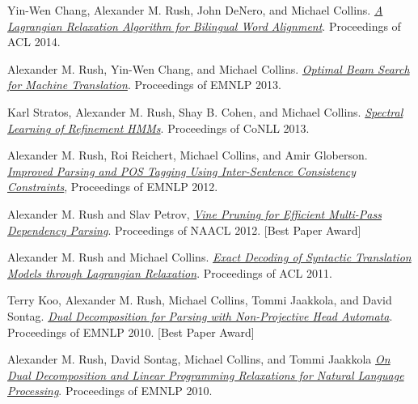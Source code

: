\documentclass[11pt]{article}
\begin{document}
{%


\ind Yin-Wen Chang, Alexander M. Rush, John DeNero, and Michael Collins. 
\emph{\href{http://people.csail.mit.edu/srush/}{A Lagrangian Relaxation Algorithm for Bilingual Word Alignment}}.
Proceedings of ACL 2014.

\medskip

\ind Alexander M. Rush, Yin-Wen Chang, and Michael Collins. 
\emph{\href{http://people.csail.mit.edu/srush/}{Optimal Beam Search for Machine Translation}}.
Proceedings of EMNLP 2013.

\medskip

\ind Karl Stratos, Alexander M. Rush, Shay B. Cohen, and Michael Collins. 
\emph{\href{http://www.cs.columbia.edu/~stratos/research/conll13rhmm.pdf}{Spectral Learning of Refinement HMMs}}.
Proceedings of CoNLL 2013.

\medskip

\ind Alexander M. Rush, Roi Reichert, Michael Collins, and Amir Globerson.
\emph{\href{http://people.csail.mit.edu/srush/emnlp2012.pdf.pdf}{Improved Parsing and POS Tagging Using Inter-Sentence Consistency Constraints}}, 
Proceedings of EMNLP 2012. 

\medskip

\ind Alexander M. Rush and Slav Petrov, \emph{\href{http://people.csail.mit.edu/srush/vine-paper.pdf}{Vine Pruning for Efficient Multi-Pass Dependency Parsing}}. Proceedings of NAACL 2012. [Best Paper Award]


\medskip

\ind Alexander M. Rush and Michael Collins. \emph{\href{http://people.csail.mit.edu/srush/exdecmt.pdf}{Exact Decoding of Syntactic Translation Models through Lagrangian Relaxation}}. Proceedings of ACL 2011.

\medskip

\ind Terry Koo, Alexander M. Rush, Michael Collins, Tommi Jaakkola, and David Sontag. \emph{\href{http://people.csail.mit.edu/maestro/papers/koo10mstdd.pdf}{Dual Decomposition for Parsing with Non-Projective Head Automata}}. Proceedings of EMNLP 2010. [Best Paper Award]

\medskip

\ind Alexander M. Rush, David Sontag, Michael Collins, and Tommi Jaakkola \emph{\href{http://people.csail.mit.edu/dsontag/papers/RusSonColJaa_emnlp10.pdf}{On Dual Decomposition and Linear Programming Relaxations for Natural Language Processing}}. Proceedings of EMNLP 2010.

}
\end{document}
